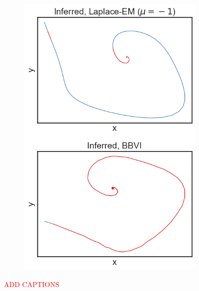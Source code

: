 \begin{figure}
\begin{subfigure}[b]{0.33\linewidth}
        \includegraphics[width=\linewidth]{./Figures/vdp-good-mu-1.png}
        \caption{}
        \label{goodvdp:c}
        \vspace{4ex}
    \end{subfigure}
    \caption{\textcolor{red}{ADD CAPTIONS}}
    \label{goodvdp}
\end{figure}

